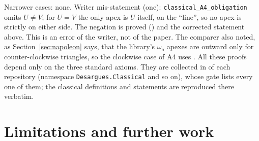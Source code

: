 \documentclass[11pt]{article}
\theoremstyle{definition}
\theoremstyle{remark}
\newcommand{\lean}[1]{\texttt{#1}}
\begin{document}
Narrower cases: none. Writer mis-statement (one): \lean{classical\_A4\_obligation} omits $U\ne V$;
for $U=V$ the only apex is $U$ itself, on the ``line'', so no apex is strictly on either side. The
negation is proved () and the corrected statement
above. This is an error of the writer, not of the paper. The comparer also noted, as
Section~\ref{sec:napoleon} says, that the library's $\omega_o$ apexes are outward only for
counter-clockwise triangles, so the clockwise case of A4 uses . All
these proofs depend only on the three standard axioms. They are collected in
 of each repository (namespace \lean{Desargues.Classical} and so on), whose
gate lists every one of them; the classical definitions and statements are reproduced there
verbatim.

\section{Limitations and further work}\label{sec:limits}
\end{document}
